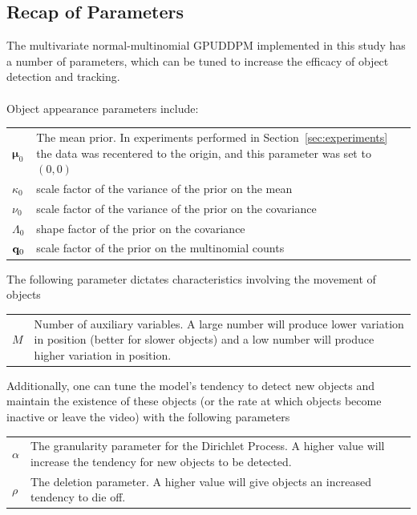 \documentclass[smallcondensed, final]{svjour3}
\begin{document}






\subsection{Recap of Parameters}
\label{sec:parameter_recap}

The multivariate normal-multinomial GPUDDPM implemented in this study has a number of parameters, which can be tuned to increase the efficacy of object detection and tracking. \\ \\
Object appearance parameters include:
\begin{center}
\begin{tabular}[c]{l p{10cm}}
$\boldsymbol{\mu}_{0}$  &  The mean prior. In experiments performed in Section~\ref{sec:experiments} the data was recentered to the origin, and this parameter was set to $(0,0)$ \\
$\kappa_{0}$  &  scale factor of the variance of the prior on the mean\\
$\nu_{0}$  &  scale factor of the variance of the prior on the covariance\\
$\Lambda_{0}$  &  shape factor of the prior on the covariance\\
$\bold{q}_{0}$  &  scale factor of the prior on the multinomial counts
\end{tabular}
\end{center} \vspace{3mm}
The following parameter dictates characteristics involving the movement of objects
\begin{center}
\begin{tabular}[c]{l p{10cm}}
$M$  &  Number of auxiliary variables. A large number will produce lower variation in position (better for slower objects) and a low number will produce higher variation in position.
\end{tabular}
\end{center} \vspace{3mm}
Additionally, one can tune the model's tendency to detect new objects and maintain the existence of these objects (or the rate at which objects become inactive or leave the video) with the following parameters
\begin{center}
\begin{tabular}[c]{l p{10cm}}
$\alpha$  &  The granularity parameter for the Dirichlet Process. A higher value will increase the tendency for new objects to be detected.\\
$\rho$  &  The deletion parameter. A higher value will give objects an increased tendency to die off.
\end{tabular}
\end{center}
\end{document}
